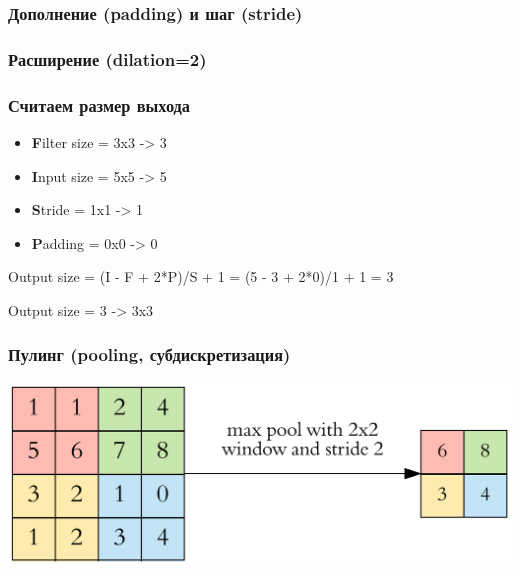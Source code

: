 \documentclass[fullscreen=true, bookmarks=true, hyperref={pdfencoding=unicode}]{beamer}
\begin{document}
\begin{frame}
  \frametitle{Дополнение (padding) и шаг (stride)}
  \begin{center}
  \end{center}
\end{frame}

\begin{frame}
  \frametitle{Расширение (dilation=2)}
  \begin{center}
  \end{center}
\end{frame}


\begin{frame}
  \frametitle{Считаем размер выхода}
  \begin{itemize}
    \item {\bf F}ilter size = 3x3 -> 3
    \item {\bf I}nput size = 5x5 -> 5
    \item {\bf S}tride = 1x1 -> 1
    \item {\bf P}adding = 0x0 -> 0
  \end{itemize}

  Output size = (I - F + 2*P)/S + 1 = (5 - 3 + 2*0)/1 + 1 = 3

  Output size = 3 -> 3x3
\end{frame}


\begin{frame}
  \frametitle{Пулинг (pooling, субдискретизация)}
  \begin{center}
    \includegraphics[keepaspectratio,
                     width=0.7\paperwidth]{max_pooling.png}
  \end{center}
\end{frame}
\end{document}

